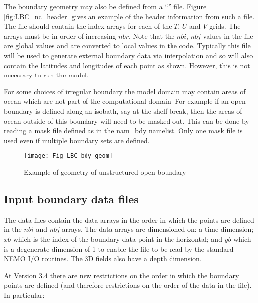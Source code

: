 \documentclass[../tex_main/NEMO_manual]{subfiles}
\begin{document}
The boundary geometry may also be defined from a ``'' file.
Figure \autoref{fig:LBC_nc_header} gives an example of the header information from such a file.
The file should contain the index arrays for each of the $T$, $U$ and $V$ grids.
The arrays must be in order of increasing $nbr$.
Note that the $nbi$, $nbj$ values in the file are global values and are converted to local values in the code.
Typically this file will be used to generate external boundary data via interpolation and so
will also contain the latitudes and longitudes of each point as shown.
However, this is not necessary to run the model. 

For some choices of irregular boundary the model domain may contain areas of ocean which
are not part of the computational domain.
For example if an open boundary is defined along an isobath, say at the shelf break,
then the areas of ocean outside of this boundary will need to be masked out.
This can be done by reading a mask file defined as  in the nam\_bdy namelist.
Only one mask file is used even if multiple boundary sets are defined.

\begin{figure}[!t]      \begin{center}
\texttt{[image: Fig\_LBC\_bdy\_geom]}
\caption {      \protect\label{fig:LBC_bdy_geom}
  Example of geometry of unstructured open boundary}
\end{center}   \end{figure}

\subsection{Input boundary data files}
\label{subsec:BDY_data}

The data files contain the data arrays in the order in which the points are defined in the $nbi$ and $nbj$ arrays.
The data arrays are dimensioned on:
a time dimension;
$xb$ which is the index of the boundary data point in the horizontal;
and $yb$ which is a degenerate dimension of 1 to enable the file to be read by the standard NEMO I/O routines.
The 3D fields also have a depth dimension. 

At Version 3.4 there are new restrictions on the order in which the boundary points are defined
(and therefore restrictions on the order of the data in the file).
In particular:
\end{document}
